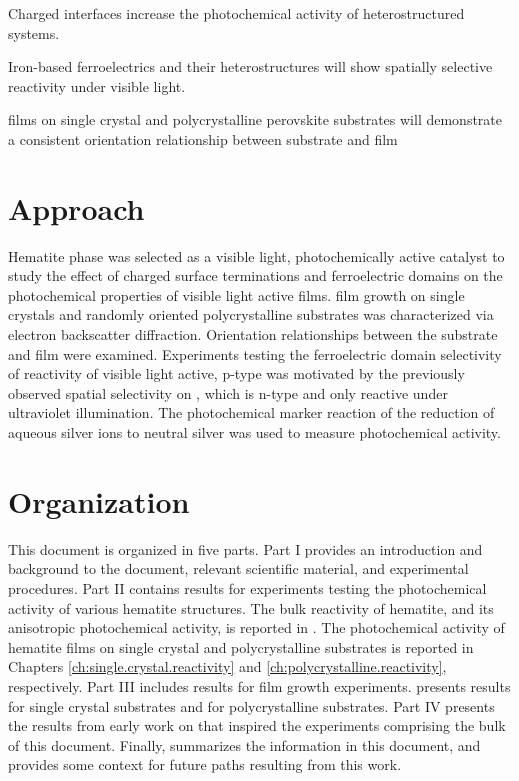 \begin{items}
	\item Charged interfaces increase the photochemical activity of heterostructured
systems.
	\item Iron-based ferroelectrics and their heterostructures will show spatially
selective reactivity under visible light.
	\item {} films on  single crystal and polycrystalline perovskite substrates
will demonstrate a consistent orientation relationship between substrate and film
\end{items}

\section{Approach}
\label{sec:intro.approach}

Hematite phase  was selected as a visible light, photochemically active catalyst
to study the effect of charged surface terminations and ferroelectric domains on the
photochemical properties of visible light active films.  film growth on
 single crystals and randomly oriented polycrystalline  substrates
was characterized via electron backscatter diffraction. Orientation relationships between
the substrate and film were examined. Experiments testing the ferroelectric domain
selectivity of reactivity of visible light active, p-type  was motivated by the
previously observed spatial selectivity on , which is n-type and only reactive
under ultraviolet illumination. The photochemical marker reaction of the reduction of
aqueous silver ions to neutral silver was used to measure photochemical activity.

\section{Organization}
\label{sec:intro.organization}

This document is organized in five parts. Part I provides an introduction and background
to the document, relevant scientific material, and experimental procedures. Part II
contains results for experiments testing the photochemical activity of various hematite
structures. The bulk reactivity of hematite, and its anisotropic photochemical activity,
is reported in . The photochemical activity of hematite films
on single crystal and polycrystalline substrates is reported in Chapters
\ref{ch:single.crystal.reactivity} and \ref{ch:polycrystalline.reactivity}, respectively.
Part III includes results for film growth experiments. 
presents results for single crystal substrates and  for
polycrystalline substrates. Part IV presents the results from early work on 
that inspired the experiments comprising the bulk of this document. Finally,
 summarizes the information in this document, and provides some
context for future paths resulting from this work.